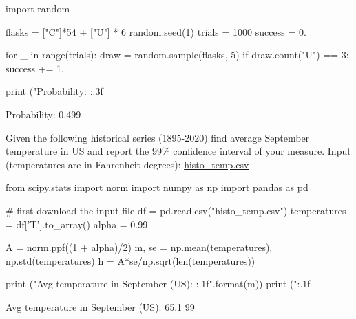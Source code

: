 \cprotEnv\begin{solution}
\begin{ipython}
import random

flasks = ["C"]*54 + ["U"] * 6
random.seed(1)
trials = 1000
success = 0.

for _ in range(trials):
    draw = random.sample(flasks, 5)
    if draw.count("U") == 3:
        success += 1.

print ("Probability: {:.3f}%
\end{ipython}
\begin{ioutput}
Probability: 0.499%
\end{ioutput}
\end{solution}

\begin{question}
Given the following historical series (1895-2020) find average September temperature in US and report the 99\% confidence interval of your measure.
\noindent
Input (temperatures are in Fahrenheit degrees): \href{https://raw.githubusercontent.com/matteosan1/finance_course/master/input_files/histo_temp.csv}{histo\_temp.csv}
\end{question}

\cprotEnv\begin{solution}
\begin{ipython}
from scipy.stats import norm
import numpy as np
import pandas as pd

# first download the input file
df = pd.read.csv("histo_temp.csv")
temperatures = df['T'].to_array()
alpha = 0.99

A = norm.ppf((1 + alpha)/2)
m, se = np.mean(temperatures), np.std(temperatures)
h = A*se/np.sqrt(len(temperatures))

print ("Avg temperature in September (US): {:.1f}".format(m))
print ("{:.1f}%
\end{ipython}
\begin{ioutput}
Avg temperature in September (US): 65.1
99%
\end{ioutput}
\end{solution}

